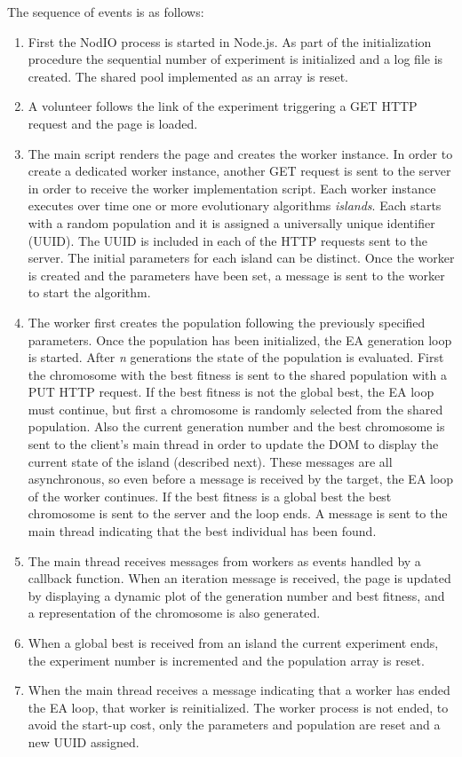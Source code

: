 \documentclass[journal,onecolumn]{IEEEtran}
\begin{document}
The sequence of events is as follows:
\begin{enumerate}
\item First the {\sf NodIO} process is started in Node.js. As part of the
initialization procedure the sequential number of experiment is initialized and a log
file is created. The shared pool implemented as an array is reset.
\item A volunteer follows the link of the experiment triggering a GET HTTP
request and the page is loaded.
\item The main script renders the page and creates the worker instance. In
order to create a dedicated worker instance, another GET request is sent to the
server in order to receive the worker implementation script.
Each worker instance executes over time one or more evolutionary algorithms
{\em islands}. Each starts with a random population and it is assigned a
universally unique identifier (UUID). The UUID is included in each of the HTTP
requests sent to the server.
The initial parameters for each island
can be distinct. Once the worker is created and the parameters have been set,
a message is sent to the worker to start the algorithm.
\item The worker first creates the population following the previously
specified parameters. Once the population has been initialized, the EA
generation loop is started. After {\em n} generations the state of the population
is evaluated. First the chromosome with the best fitness is sent to the shared
population with a PUT HTTP request. If the best fitness is not the global best,
the EA loop must continue, but first a chromosome is randomly selected from
the shared population. Also the current generation number and the best
chromosome is sent to the client's main thread in order to update the DOM to
display the current state of the island (described next). These messages are
all asynchronous, so even before a message is received by the target, the EA loop of
the worker continues. If the best fitness is a global best the best
chromosome is sent to the server and the loop ends. A message is sent to the
main thread indicating that the best individual has been found.
\item The main thread receives messages from workers as events handled by
a callback function. When an iteration message is received, the page is
updated by displaying a dynamic plot of the generation number and best
fitness, and a representation of the chromosome is also generated.
\item When a global best is received from an island the current experiment
ends, the experiment number is incremented and the population array is reset.
\item When the main thread receives a message indicating that a worker has ended the EA
loop, that worker is reinitialized. The worker process is not ended, to
avoid the start-up cost, only the parameters and population are reset and a new UUID
assigned.
\end{enumerate}
\end{document}
